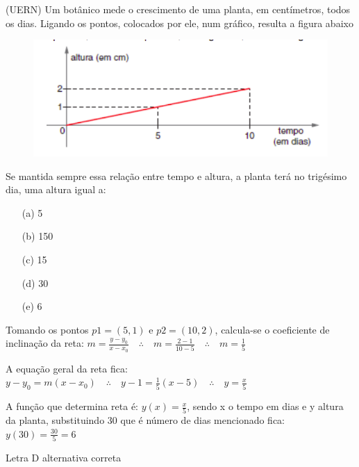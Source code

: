 \begin{multicols*}{2}
            (UERN) Um botânico mede o crescimento de uma planta, em centímetros, todos os dias. Ligando os 			pontos, colocados por ele, num gráfico, resulta a figura abaixo
            \begin{figure}[H]
                \includegraphics[scale=0.4]{assets/rafael/img15.png}
            \end{figure}
            Se mantida sempre essa relação entre tempo e altura, a planta terá no trigésimo dia, uma altura 		igual a:
            \begin{enumerate}
            \item[(a)] 5
            \item[(b)] 150
            \item[(c)] 15
            \item[(d)] 30
            \item[(e)] 6
            \end{enumerate}
             
             Tomando os pontos $p1= (5,1)$  e $p2 = (10,2)$, calcula-se o coeficiente de inclinação da reta:
             $m = \frac{y - y_0}{x - x_0} \quad \therefore \quad m = \frac{2 - 1}{10 - 5} 
             \quad \therefore \quad m = \frac{1}{5}$ 
             
             A equação geral da reta fica: $y - y_0 = m(x-x_0) \quad \therefore \quad  
             y -1 =  \frac{1}{5} \left(x - 5 \right) \quad \therefore \quad y = \frac{x}{5}$
             
             A função que determina reta é: $y(x) = \frac{x}{5}$, sendo x o tempo em dias e y altura da 				planta, substituindo 30 que é número de dias mencionado fica: $y(30) = \frac{30}{5} = 6$
             
             Letra D alternativa correta
             

\end{multicols*}
